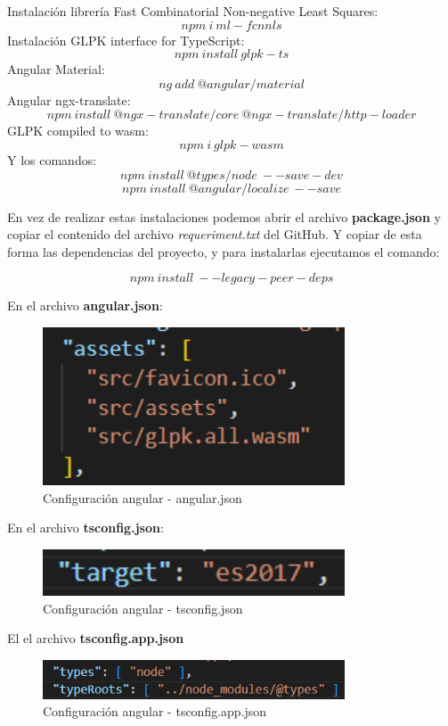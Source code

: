 Instalación librería Fast Combinatorial Non-negative Least Squares:
$$ npm\:i\:ml-fcnnls $$
Instalación GLPK interface for TypeScript:
$$ npm\:install\:glpk-ts $$
Angular Material:
$$ ng\:add\:@angular/material  $$
Angular ngx-translate:
$$ npm\:install\:@ngx-translate/core\:@ngx-translate/http-loader $$
GLPK compiled to wasm:
$$ npm\:i\:glpk-wasm $$
Y los comandos:
$$ npm\:install\:@types/node\:--save-dev $$
$$ npm\:install\:@angular/localize\:--save $$

En vez de realizar estas instalaciones podemos abrir el archivo \textbf{package.json} y copiar el contenido del archivo \textit{requeriment.txt} del GitHub. Y copiar de esta forma las dependencias del proyecto, y para instalarlas ejecutamos el comando:

$$ npm\:install\:--legacy-peer-deps $$

En el archivo \textbf{angular.json}: 

\begin{figure}[h!] 
\centering
    \includegraphics[width=0.8\textwidth]{img/angular_json.PNG}
\caption{Configuración angular - angular.json}
\label{fig:angular_json}
\end{figure}

\newpage
En el archivo \textbf{tsconfig.json}: 

\begin{figure}[h!] 
\centering
    \includegraphics[width=0.8\textwidth]{img/tsconfig_json.PNG}
\caption{Configuración angular - tsconfig.json}
\label{fig:tsconfig_json}
\end{figure}

El el archivo \textbf{tsconfig.app.json}

\begin{figure}[h!] 
\centering
    \includegraphics[width=0.8\textwidth]{img/tsconfig_app_json.PNG}
\caption{Configuración angular - tsconfig.app.json}
\label{fig:tsconfig_app_json}
\end{figure}

